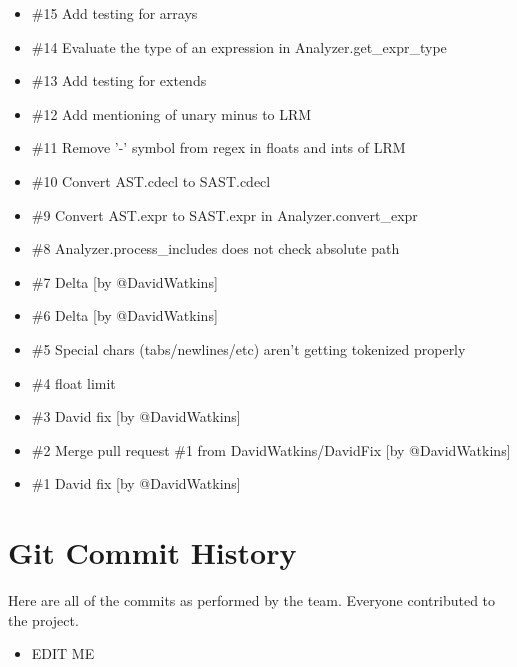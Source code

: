 \begin{homeworkProblem}
\begin{itemize}
		\item \#15 Add testing for arrays
		\item \#14 Evaluate the type of an expression in Analyzer.get\_expr\_type
		\item \#13 Add testing for extends
		\item \#12 Add mentioning of unary minus to LRM
		\item \#11 Remove '-' symbol from regex in floats and ints of LRM
		\item \#10 Convert AST.cdecl to SAST.cdecl
		\item \#9 Convert AST.expr to SAST.expr in Analyzer.convert\_expr
		\item \#8 Analyzer.process\_includes does not check absolute path
		\item \#7 Delta [by @DavidWatkins]
		\item \#6 Delta [by @DavidWatkins]
		\item \#5 Special chars (tabs/newlines/etc) aren't getting tokenized properly
		\item \#4 float limit
		\item \#3 David fix [by @DavidWatkins]
		\item \#2 Merge pull request \#1 from DavidWatkins/DavidFix [by @DavidWatkins]
		\item \#1 David fix [by @DavidWatkins]
	\end{itemize}
	\section{Git Commit History}
	Here are all of the commits as performed by the team. Everyone contributed to the project.
	\begin{itemize}
		\item EDIT ME
	\end{itemize}

\end{homeworkProblem}
